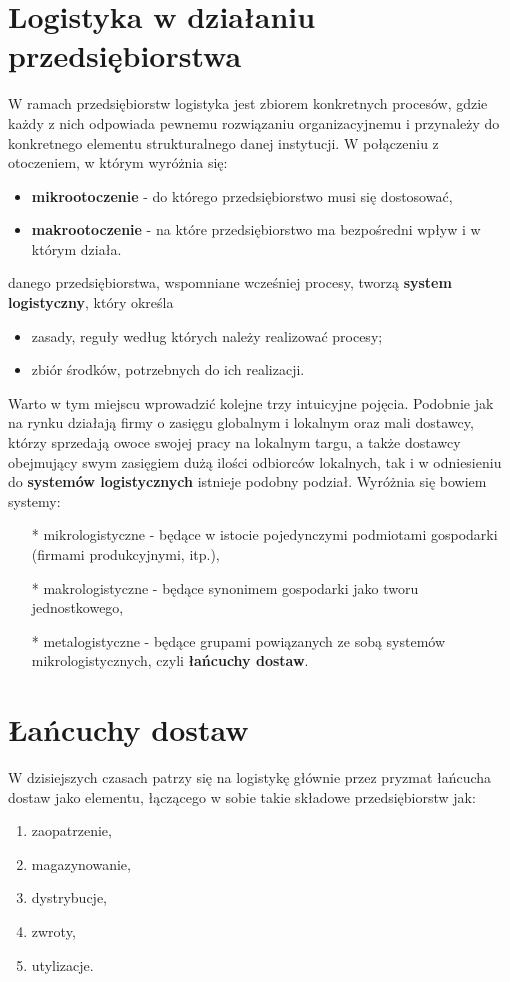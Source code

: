 \section{Logistyka w działaniu przedsiębiorstwa}  
	W ramach przedsiębiorstw logistyka jest zbiorem konkretnych procesów, 
	gdzie każdy z nich odpowiada pewnemu rozwiązaniu organizacyjnemu i przynależy do konkretnego 
	elementu strukturalnego danej instytucji. W połączeniu z otoczeniem, w którym wyróżnia się:
	\begin{itemize}
		\item \textbf{mikrootoczenie} - do którego przedsiębiorstwo musi się dostosować,
		\item \textbf{makrootoczenie} - na które przedsiębiorstwo ma bezpośredni wpływ i w którym działa.
	\end{itemize}
	danego przedsiębiorstwa, wspomniane wcześniej procesy, tworzą \textbf{system logistyczny}, który określa
	\begin{itemize}
		\item zasady, reguły według których należy realizować procesy;
		\item zbiór środków, potrzebnych do ich realizacji.
	\end{itemize}
	Warto w tym miejscu wprowadzić kolejne trzy intuicyjne pojęcia. Podobnie jak na rynku
	działają firmy o zasięgu globalnym i lokalnym oraz mali dostawcy, którzy sprzedają
	owoce swojej pracy na lokalnym targu, a także dostawcy obejmujący swym zasięgiem dużą ilości
	odbiorców lokalnych, tak i w odniesieniu do \textbf{systemów logistycznych}
	istnieje podobny podział. Wyróżnia się bowiem systemy:
	\begin{itemize}
		\item[*] mikrologistyczne 	- będące w istocie pojedynczymi podmiotami gospodarki (firmami produkcyjnymi, itp.),
		\item[*] makrologistyczne 	- będące synonimem gospodarki jako tworu jednostkowego,
		\item[*] metalogistyczne	- będące grupami powiązanych ze sobą systemów mikrologistycznych, 
		czyli \textbf{łańcuchy dostaw}\cite{systemy_logistyczne_podstawy_funkcjonowania}.
	\end{itemize}

\section{Łańcuchy dostaw}
\label{c2:supply_chains}
	W dzisiejszych czasach patrzy się na logistykę 
	głównie przez pryzmat łańcucha dostaw jako
	elementu, łączącego w sobie takie składowe przedsiębiorstw jak:
	\begin{enumerate}
		\item zaopatrzenie,
		\item magazynowanie,
		\item dystrybucje,
		\item zwroty,
		\item utylizacje.
	\end{enumerate}
	
